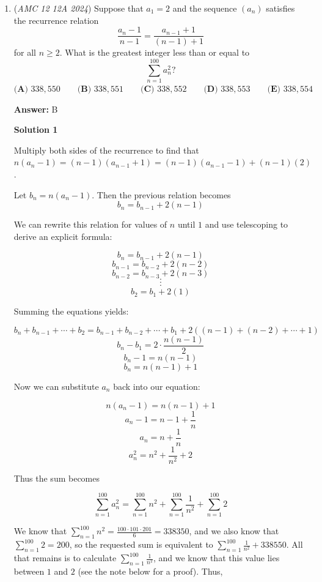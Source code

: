 \begin{enumerate}
 \textbf{Another note} If you're feeling up to it, you can assume that the curve is actually a $90^{\circ}$ sector of a circle with radius $\frac{1}{2}.$ Doing so yields 
 \[P = 1 - \pi\frac{\left(\frac{1}{2}\right)^2}{4} \approx 0.8037,\]which is clearly within the interval $D$. This is also an under-estimate, since the curve of $\frac{1}{2x}$ is not as steep on the interval $x\in (0.5, 1).$



	\item (\textit{AMC 12 12A 2024}) Suppose that $a_1 = 2$ and the sequence $(a_n)$ satisfies the recurrence relation 
 \[\frac{a_n -1}{n-1}=\frac{a_{n-1}+1}{(n-1)+1}\]for all $n \ge 2.$ What is the greatest integer less than or equal to 
 \[\sum^{100}_{n=1} a_n^2?\]
$\textbf{(A) } 338{,}550 \qquad \textbf{(B) } 338{,}551 \qquad \textbf{(C) } 338{,}552 \qquad \textbf{(D) } 338{,}553 \qquad \textbf{(E) } 338{,}554$

 \textbf{Answer: }B



\textbf{Solution 1}

Multiply both sides of the recurrence to find that $n(a_n-1)=(n-1)(a_{n-1}+1)=(n-1)(a_{n-1}-1)+(n-1)(2)$.

 Let $b_n=n(a_n-1)$. Then the previous relation becomes
 \[b_n=b_{n-1}+2(n-1)\]

 We can rewrite this relation for values of $n$ until $1$ and use telescoping to derive an explicit formula:

 
 \[b_n=b_{n-1}+2(n-1)\]
 \[b_{n-1}=b_{n-2}+2(n-2)\]
 \[b_{n-2}=b_{n-3}+2(n-3)\]
 \[\cdot\]
 \[\cdot\]
 \[\cdot\]
 \[b_2=b_1+2(1)\]

 Summing the equations yields:

 
 \[b_n+b_{n-1}+\cdots+b_2=b_{n-1}+b_{n-2}+\cdots+b_1+2((n-1)+(n-2)+\cdots+1)\]
 \[b_n-b_1=2\cdot\frac{n(n-1)}{2}\]
 \[b_n-1=n(n-1)\]
 \[b_n=n(n-1)+1\]

 Now we can substitute $a_n$ back into our equation:

 
 \[n(a_n-1)=n(n-1)+1\]
 \[a_n-1=n-1+\frac{1}{n}\]
 \[a_n=n+\frac{1}{n}\]
 \[a_n^2=n^2+\frac{1}{n^2}+2\]

 Thus the sum becomes

 
 \[\sum^{100}_{n=1} a_n^2= \sum^{100}_{n=1} n^2+ \sum^{100}_{n=1} \frac{1}{n^2}+ \sum^{100}_{n=1} 2\]

 We know that $\sum^{100}_{n=1} n^2=\frac{100\cdot101\cdot201}{6}=338350$, and we also know that $\sum^{100}_{n=1} 2=200$, so the requested sum is equivalent to $\sum^{100}_{n=1} \frac{1}{n^2}+338550$. All that remains is to calculate $\sum^{100}_{n=1} \frac{1}{n^2}$, and we know that this value lies between $1$ and $2$ (see the note below for a proof). Thus,


\end{enumerate}

